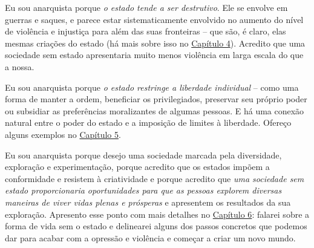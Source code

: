 Eu sou anarquista porque \emph{o estado tende a ser destrutivo}. Ele se envolve em guerras e saques, e parece estar sistematicamente envolvido no aumento do nível de violência e injustiça para além das suas fronteiras -- que são, é claro, elas mesmas criações do estado (há mais sobre isso no \hyperref[chap:4]{Capítulo 4}). Acredito que uma sociedade sem estado apresentaria muito menos violência em larga escala do que a nossa.

Eu sou anarquista porque \emph{o estado restringe a liberdade individual} -- como uma forma de manter a ordem, beneficiar os privilegiados, preservar seu próprio poder ou subsidiar as preferências moralizantes de algumas pessoas. E há uma conexão natural entre o poder do estado e a imposição de limites à liberdade. Ofereço alguns exemplos no \hyperref[chap:5]{Capítulo 5}.

Eu sou anarquista porque desejo uma sociedade marcada pela diversidade, exploração e experimentação, porque acredito que os estados impõem a conformidade e resistem à criatividade e porque acredito que \emph{uma sociedade sem estado proporcionaria oportunidades para que as pessoas explorem diversas maneiras de viver vidas plenas e prósperas} e apresentem os resultados da sua exploração. Apresento esse ponto com mais detalhes no \hyperref[chap:6]{Capítulo 6}: falarei sobre a forma de vida sem o estado e delinearei alguns dos passos concretos que podemos dar para acabar com a opressão e violência e começar a criar um novo mundo.